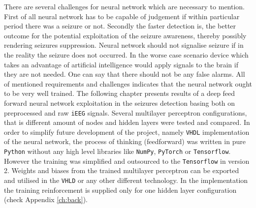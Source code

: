 There are several challenges for neural network which are necessary to mention. First of all neural network has to be capable of judgement if within particular period there was a seizure or not. Secondly the faster detection is, the better outcome for the potential exploitation of the seizure awareness, thereby possibly rendering seizures suppression. Neural network should not signalise seizure if in the reality the seizure does not occurred. In the worse case scenario device which takes an advantage of artificial intelligence would apply signals to the brain if they are not needed. One can say that there should not be any false alarms. All of mentioned requirements and challenges indicates that the neural network ought to be very well trained. The following chapter presents results of a deep feed forward neural network exploitation in the seizures detection basing both on preprocessed and raw \verb|iEEG| signals. Several multilayer perceptron configurations, that is different amount of nodes and hidden layers were tested and compared. In order to simplify future development of the project, namely \verb|VHDL| implementation of the neural network, the process of thinking (feedforward) was written in pure \verb|Python| without any high level libraries like \verb|NumPy|, \verb|PyTorch| or \verb|Tensorflow|. However the training was simplified and outsourced to the \verb|Tensorflow| in version 2. Weights and biases from the trained multilayer perceptron can be exported and utilised in the \verb|VHLD| or any other different technology. In the implementation the training reinforcement is supplied only for one hidden layer configuration (check Appendix \ref{ch:back}).

